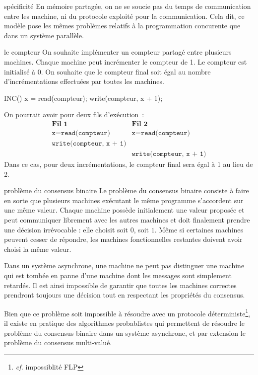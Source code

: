 \begin{remarque}{}{spécificité}
    En mémoire partagée, on ne se soucie pas du  temps de communication entre les machine, ni du protocole exploité pour la communication. Cela dit, ce modèle pose les mêmes problèmes relatifs à la programmation concurente que dans un système parallèle.
\end{remarque}


\begin{exemple}{}{le compteur}
  On souhaite implémenter un compteur partagé entre plusieurs machines. Chaque machine peut incrémenter le compteur de 1. Le compteur est initialisé à 0. On souhaite que le compteur final soit égal au nombre d'incrémentations effectuées par toutes les machines.
  \begin{lstLNat}
    INC() {
      x = read(compteur);
      write(compteur, x + 1);
    }
  \end{lstLNat}
  On pourrait avoir pour deux fils d'exécution~:
  $$
  \begin{array}{c|c}
  \textbf{Fil 1} & \textbf{Fil 2} \\[0.5em]
  \hline
  \texttt{x} = \texttt{read(compteur)} & \texttt{x} = \texttt{read(compteur)} \\[0.3em]
  \texttt{write(compteur, x + 1)} & \\[0.3em]
  & \texttt{write(compteur, x + 1)}
  \end{array}
  $$
  Dans ce cas, pour deux incrémentations, le compteur final sera égal à 1 au lieu de 2. 
\end{exemple}

\begin{exemple}{}{problème du consensus binaire} 
  Le problème du consensus binaire consiste à faire en sorte que plusieurs machines exécutant le même programme s'accordent sur une même valeur. Chaque machine possède initialement une valeur proposée et peut communiquer  librement avec les autres machines et doit finalement prendre une décision irrévocable : elle choisit soit $0$, soit $1$. Même si certaines machines peuvent cesser de répondre, les machines fonctionnelles restantes doivent  avoir choisi la même valeur. \par
  Dans un système asynchrone, une machine ne peut pas distinguer une machine qui est tombée en panne d'une machine dont les messages sont simplement retardés. Il est ainsi impossible de garantir que toutes les machines correctes prendront toujours une décision tout en respectant les propriétés du consensus. 

  Bien que ce problème soit impossible à résoudre avec un protocole déterministe\footnote{\textit{cf.} impossiblité FLP}, il existe en pratique des algorithmes probablistes qui permettent de résoudre le problème du consensus binaire dans un système asynchrone, et par extension le problème du consensus multi-valué.
\end{exemple}


